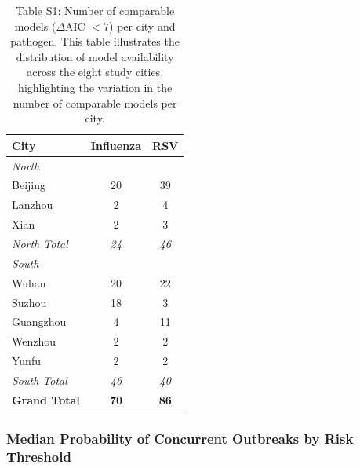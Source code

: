 \begin{table}[htbp]
\centering
\caption{Table S1: Number of comparable models ($\Delta$AIC $< 7$) per city and pathogen. This table illustrates the distribution of model availability across the eight study cities, highlighting the variation in the number of comparable models per city.}
\label{tab:comparable_models}
\begin{tabular}{lcc}
\toprule
\textbf{City} & \textbf{Influenza} & \textbf{RSV} \\
\midrule
\multicolumn{3}{l}{\textit{North}} \\
Beijing & 20 & 39 \\
Lanzhou & 2 & 4 \\
Xian & 2 & 3 \\
\textit{North Total} & \textit{24} & \textit{46} \\
\midrule
\multicolumn{3}{l}{\textit{South}} \\
Wuhan & 20 & 22 \\
Suzhou & 18 & 3 \\
Guangzhou & 4 & 11 \\
Wenzhou & 2 & 2 \\
Yunfu & 2 & 2 \\
\textit{South Total} & \textit{46} & \textit{40} \\
\midrule
\textbf{Grand Total} & \textbf{70} & \textbf{86} \\
\bottomrule
\end{tabular}
\end{table}

\clearpage

\subsubsection{Median Probability of Concurrent Outbreaks by Risk Threshold}
\label{subsec:joint_outbreak_probability}

